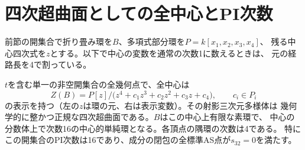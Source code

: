 \section{四次超曲面としての全中心とPI次数}
\label{sec:quartic-center-order}
前節の開集合で折り畳み環を$B$、多項式部分環を$P=k[x_1,x_2,x_3,x_4]$、
残る中心四次式を$z$とする。以下で中心の変数を通常の次数1に数えるときは、
元の経路長を4で割っている。

\begin{theorem}\label{thm:quartic-center-order}
$t$を含む単一の非空開集合の全幾何点で、全中心は
\[
 Z(B)=P[z]/\bigl(z^4+c_1z^3+c_2z^2+c_3z+c_4\bigr),
       \qquad c_i\in P_i
\]
の表示を持つ（左の$z$は環の元、右は表示変数）。その射影三次元多様体は
幾何学的に整かつ正規な四次超曲面である。$B$はこの中心上有限な素環で、
中心の分数体上で次数16の中心的単純環となる。各頂点の隅環の次数は4である。
特にこの開集合のPI次数は16であり、成分の閉包の全標準AS点が$s_{32}=0$を満たす。
\end{theorem}
